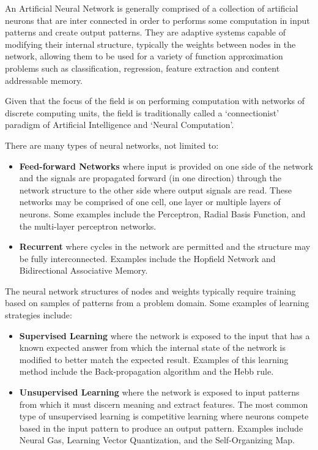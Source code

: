 \documentclass[a4paper, 11pt]{article}
\begin{document}
An Artificial Neural Network is generally comprised of a collection of artificial neurons that are inter connected in order to performs some computation in input patterns and create output patterns. They are adaptive systems capable of modifying their internal structure, typically the weights between nodes in the network, allowing them to be used for a variety of function approximation problems such as classification, regression, feature extraction and content addressable memory.

Given that the focus of the field is on performing computation with networks of discrete computing units, the field is traditionally called a `connectionist' paradigm of Artificial Intelligence and `Neural Computation'.

There are many types of neural networks, not limited to:

\begin{itemize}
	\item \textbf{Feed-forward Networks} where input is provided on one side of the network and the signals are propagated forward (in one direction) through the network structure to the other side where output signals are read. These networks may be comprised of one cell, one layer or multiple layers of neurons. Some examples include the Perceptron, Radial Basis Function, and the multi-layer perceptron networks.
	\item \textbf{Recurrent} where cycles in the network are permitted and the structure may be fully interconnected. Examples include the Hopfield Network and Bidirectional Associative Memory.
\end{itemize}

The neural network structures of nodes and weights typically require training based on samples of patterns from a problem domain. Some examples of learning strategies include:

\begin{itemize}
	\item \textbf{Supervised Learning} where the network is exposed to the input that has a known expected answer from which the internal state of the network is modified to better match the expected result. Examples of this learning method include the Back-propagation algorithm and the Hebb rule.
	\item \textbf{Unsupervised Learning} where the network is exposed to input patterns from which it must discern meaning and extract features. The most common type of unsupervised learning is competitive learning where neurons compete based in the input pattern to produce an output pattern. Examples include Neural Gas, Learning Vector Quantization, and the Self-Organizing Map.
\end{itemize}
\end{document}
